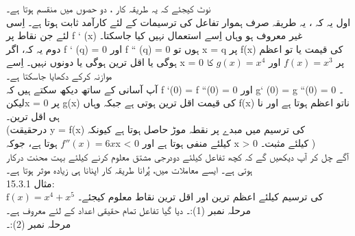نوٹ کیجئے کہ یہ طریقہ کار ، دو حصوں میں منقسم ہوتا ہے۔\\
اول یہ کہ ،  یہ طریقہ صرف ہموار تفاعل کی ترسیمات کے لئے کارآمد ثابت ہوتا ہے۔ اِسی لئے جن نقاط پر f ` (x) غیر معروف ہو وہاں اِسے استعمال نہیں کیا جاسکتا۔ \\
دوم یہ کہ، اگر f ` (q) = 0  اور   f `` (q) = 0 ہوں تو  x = q پر f(x) کی قیمت یا تو اعظم ہوگی یا اقل ترین ہوگی یا  دونوں نہیں۔ اِسے x = 0 پر
 \(f(x) = x^{3}\)
  اور
   \(g(x) = x^{4}\)
    کا موازنہ کرکے دکھایا جاسکتا ہے۔\\

 آپ آسانی کے ساتھ دیکھ سکتے ہیں کہ f `(0) = f ``(0) = 0 اور g` (0) = g ``(0) = 0 ۔\\
 لیکنx = 0   پر g(x)  کی قیمت اقل ترین ہوتی ہے جبکہ وہاں f(x) ناتو اعظم ہوتا ہے اور نا ہی اقل ترین۔\\
(درحقیقت  y = f(x)  کی ترسیم میں مبدے پر نقطہ موڑ حاصل ہوتا ہے کیونکہ   
\(f''(x)=6x\)
ہوتا ہے، جوکہx < 0  کیلئے منفی ہوتا ہے اور x > 0 کیلئے مثبت۔ )\\
آگے چل کر آپ دیکھیں گے کہ کچھ تفاعل کیلئے دودرجی مشتق معلوم کرنے کیلئے بہت محنت درکار ہوتی ہے۔ ایسے معاملات میں،  پُرانا طریقہ کار اپنانا ہی زیادہ موثر ہوتا ہے۔ \\

15.3.1 مثال:\\
\( \text{f}(x) = x^{4} + x^{5} \)
 کی ترسیم کیلئے اعظم ترین اور اقل ترین نقاط معلوم کیجئے۔ \\
مرحلہ نمبر (1):۔ دیا گیا تفاعل تمام حقیقی اعداد کے لئے معروف  ہے۔ \\
مرحلہ نمبر (2):۔ 

